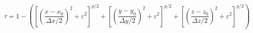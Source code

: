 \begin{equation}
\tau = 1 - \left(
    \left[\left(\frac{x - x_0}{\Delta x / 2}\right)^2 + \varepsilon^2 \right]^{p/2} +
    \left[\left(\frac{y - y_0}{\Delta y / 2}\right)^2 + \varepsilon^2 \right]^{p/2} +
    \left[\left(\frac{z - z_0}{\Delta z / 2}\right)^2 + \varepsilon^2 \right]^{p/2}
\right)
\label{eq:tau_ekblom}
\end{equation}

